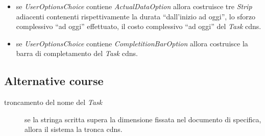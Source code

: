 \begin{enumerate}
\begin{itemize}
    	\item se \emph{UserOptionsChoice} contiene \emph{ActualDataOption} allora
    	costruisce tre \emph{Strip} adiacenti contenenti rispettivamente la durata
    	“dall’inizio ad oggi”, lo sforzo complessivo “ad oggi” effettuato, il
    	costo complessivo “ad oggi” del \emph{Task} cdns.
    	
		\item se \emph{UserOptionsChoice} contiene \emph{CompletitionBarOption}
		allora costruisce la barra di completamento del \emph{Task} cdns.
		
    \end{itemize}
\end{enumerate}

\subsection{Alternative course}
\begin{description}
  \item[troncamento del nome del \emph{Task}] se la stringa scritta supera la
  dimensione fissata nel documento di specifica, allora il sistema la tronca
  cdns.


\end{description}
